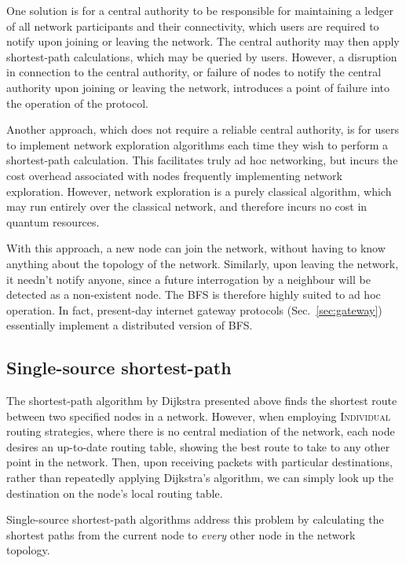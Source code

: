 \documentclass[aps,rmp,twocolumn,amsmath,amssymb,nofootinbib,superscriptaddress,longbibliography,floatfix,table-of-contents,eqsecnum]{revtex4-1}
\begin{document}
One solution is for a central authority to be responsible for maintaining a ledger of all network participants and their connectivity, which users are required to notify upon joining or leaving the network. The central authority may then apply shortest-path calculations, which may be queried by users. However, a disruption in connection to the central authority, or failure of nodes to notify the central authority upon joining or leaving the network, introduces a point of failure into the operation of the protocol.

Another approach, which does not require a reliable central authority, is for users to implement network exploration algorithms each time they wish to perform a shortest-path calculation. This facilitates truly ad hoc networking, but incurs the cost overhead associated with nodes frequently implementing network exploration. However, network exploration is a purely classical algorithm, which may run entirely over the classical network, and therefore incurs no cost in quantum resources.

With this approach, a new node can join the network, without having to know anything about the topology of the network. Similarly, upon leaving the network, it needn't notify anyone, since a future interrogation by a neighbour will be detected as a non-existent node. The BFS is therefore highly suited to ad hoc operation. In fact, present-day internet gateway protocols (Sec.~\ref{sec:gateway}) essentially implement a distributed version of BFS.

%
%

\subsection{Single-source shortest-path} \label{sec:single_source_sp} 

The shortest-path algorithm by Dijkstra presented above finds the shortest route between two specified nodes in a network. However, when employing \textsc{Individual} routing strategies, where there is no central mediation of the network, each node desires an up-to-date routing table, showing the best route to take to any other point in the network. Then, upon receiving packets with particular destinations, rather than repeatedly applying Dijkstra's algorithm, we can simply look up the destination on the node's local routing table.

Single-source shortest-path algorithms address this problem by calculating the shortest paths from the current node to \textit{every} other node in the network topology.
\end{document}

